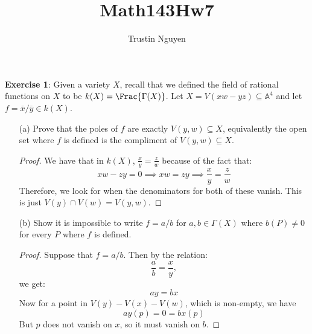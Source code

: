 \documentclass{article}
\title{Math143Hw7}
\author{Trustin Nguyen}
\begin{document}
    \maketitle

\reversemarginpar

\textbf{Exercise 1}: Given a variety $X$, recall that we defined the field of rational functions on $X$ to be $k(X) = \Frac{\Gamma(X)}$. Let $X = V(xw - yz) \subseteq \mathbb{A}^{4}$ and let $f  = \overline{x}/\overline{y} \in k(X)$.
    \begin{itemize}
        \item [(a)] Prove that the poles of $f$ are exactly $V(y, w) \subseteq X$, equivalently the open set where $f$ is defined is the compliment of $V(y, w) \subseteq X$.
            \begin{proof}
                We have that in $k(X)$, $\frac{x}{y} = \frac{z}{w}$ because of the fact that:
                    \begin{equation*}
                        xw - zy = 0 \implies xw = zy \implies \dfrac{x}{y} = \dfrac{z}{w}
                    \end{equation*}
                Therefore, we look for when the denominators for both of these vanish. This is just $V(y) \cap V(w) = V(y, w)$. 
            \end{proof}

        \item [(b)] Show it is impossible to write $f = a/b$ for $a, b \in \Gamma(X)$ where $b(P) \neq 0$ for every $P$ where $f$ is defined.
            \begin{proof}
                Suppose that $f = a/b$. Then by the relation:
                    \begin{equation*}
                        \dfrac{a}{b} = \dfrac{x}{y}, 
                    \end{equation*}
                we get:
                    \begin{equation*}
                        ay = bx
                    \end{equation*}
                Now for a point in $V(y) - V(x) - V(w)$, which is non-empty, we have
                    \begin{equation*}
                        ay(p) = 0 = bx(p)
                    \end{equation*}
                But $p$ does not vanish on $x$, so it must vanish on $b$.
            \end{proof}
    \end{itemize}
\end{document}
